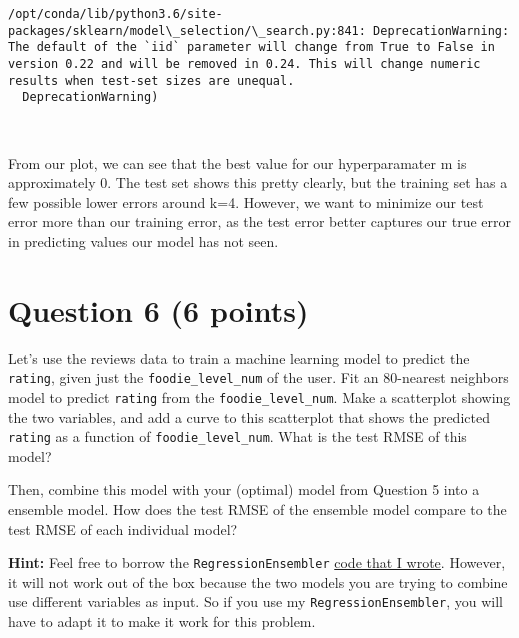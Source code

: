 \documentclass[11pt]{article}
\begin{document}
    \begin{Verbatim}[commandchars=\\\{\}]
/opt/conda/lib/python3.6/site-packages/sklearn/model\_selection/\_search.py:841: DeprecationWarning: The default of the `iid` parameter will change from True to False in version 0.22 and will be removed in 0.24. This will change numeric results when test-set sizes are unequal.
  DeprecationWarning)

    \end{Verbatim}

    \begin{center}
    \end{center}
    { \hspace*{\fill} \\}
    
    From our plot, we can see that the best value for our hyperparamater m
is approximately 0. The test set shows this pretty clearly, but the
training set has a few possible lower errors around k=4. However, we
want to minimize our test error more than our training error, as the
test error better captures our true error in predicting values our model
has not seen.

    \hypertarget{question-6-6-points}{%
\section{Question 6 (6 points)}\label{question-6-6-points}}

Let's use the reviews data to train a machine learning model to predict
the \texttt{rating}, given just the \texttt{foodie\_level\_num} of the
user. Fit an \(80\)-nearest neighbors model to predict \texttt{rating}
from the \texttt{foodie\_level\_num}. Make a scatterplot showing the two
variables, and add a curve to this scatterplot that shows the predicted
\texttt{rating} as a function of \texttt{foodie\_level\_num}. What is
the test RMSE of this model?

Then, combine this model with your (optimal) model from Question 5 into
a ensemble model. How does the test RMSE of the ensemble model compare
to the test RMSE of each individual model?

\textbf{Hint:} Feel free to borrow the \texttt{RegressionEnsembler}
\href{https://github.com/dlsun/data-science-book/blob/master/Chapter\%205\%20Machine\%20Learning\%20and\%20Regression\%20Models/5.6\%20Ensemble\%20Methods.ipynb}{code
that I wrote}. However, it will not work out of the box because the two
models you are trying to combine use different variables as input. So if
you use my \texttt{RegressionEnsembler}, you will have to adapt it to
make it work for this problem.
\end{document}

